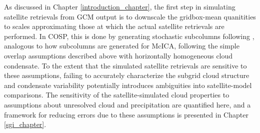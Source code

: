 As discussed in Chapter \ref{introduction_chapter}, the first step in simulating satellite retrievals from GCM output is to downscale the gridbox-mean quanitities to scales approximating those at which the actual satellite retrievals are performed. In COSP, this is done by generating stochastic subcolumns following \cite{klein_and_jakob_1999}, analogous to how subcolumns are generated for McICA, following the simple overlap assumptions described above with horizontally homogeneous cloud condensate. To the extent that the simulated satellite retrievals are sensitive to these assumptions, failing to accurately characterize the subgrid cloud structure and condensate variability potentially introduces ambiguities into satellite-model comparisons. The sensitivity of the satellite-simulated cloud properties to assumptions about unresolved cloud and precipitation are quantified here, and a framework for reducing errors due to these assumptions is presented in Chapter \ref{sgi_chapter}.



